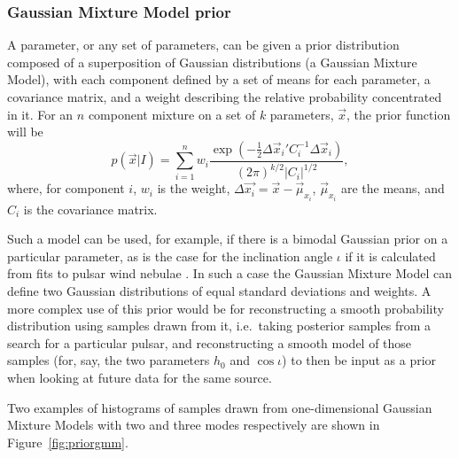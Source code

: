 \subsubsection{Gaussian Mixture Model prior}\label{sec:gmmprior}

A parameter, or any set of parameters, can be given a prior distribution composed of a superposition of Gaussian distributions (a
Gaussian Mixture Model), with each component defined by a set of means for each parameter, a covariance matrix, and a weight
describing the relative probability concentrated in it. For an $n$ component mixture on a set of $k$ parameters, $\vec{x}$, the prior
function will be
\begin{equation}
 p(\vec{x}|I) = \sum_{i=1}^n w_i\frac{\exp{\left(-\frac{1}{2}{\Delta\vec{x}_i}'C_i^{-1}\Delta\vec{x}_i\right)}}{(2\pi)^{k/2}|C_i|^{1/2}},
\end{equation}
where, for component $i$, $w_i$ is the weight, $\Delta\vec{x_i}= \vec{x}-\vec{\mu}_{x_i}$, $\vec{\mu}_{x_i}$ are the means, and
$C_i$ is the covariance matrix.

Such a model can be used, for example, if there is a bimodal Gaussian prior on a particular parameter, as is the case for the
inclination angle $\iota$ if it is calculated from fits to pulsar wind nebulae \citep[see, e.g., Appendix B in][]{2017arXiv170107709T}.
In such a case the Gaussian Mixture Model can define
two Gaussian distributions of equal standard deviations and weights. A more complex use of this prior would be for reconstructing a smooth
probability distribution using samples drawn from it, i.e.\ taking posterior samples from a search for a particular pulsar, and
reconstructing a smooth model of those samples (for, say, the two parameters $h_0$ and $\cos{\iota}$) to then be input as a prior when looking
at future data for the same source.

Two examples of histograms of samples drawn from one-dimensional Gaussian Mixture Models with two and three modes respectively
are shown in Figure~\ref{fig:priorgmm}.

